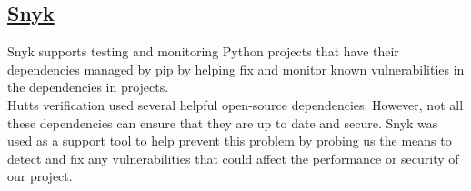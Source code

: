 \documentclass{article}
\begin{document}
		\subsection{\href{https://snyk.io}
		{Snyk}}
		Snyk supports testing and monitoring Python projects that have their dependencies
		managed by pip by helping fix and monitor known vulnerabilities in the dependencies in projects.\\

		\noindent
		Hutts verification used several helpful open-source dependencies. However, not all these
		dependencies can ensure that they are up to date and secure.
	    Snyk was used as a support tool to help prevent this problem by probing us the means
	    to detect and fix any vulnerabilities that could affect the performance or security of our project.


	
	\cleardoublepage
\end{document}

